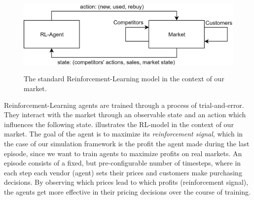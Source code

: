 \begin{figure}[t]
	\centering
	\includegraphics[width = \textwidth]{images/RL_overview.png}\\
	\caption{The standard Reinforcement-Learning model in the context of our market.}\label{fig:IntroRLDiagram}
\end{figure}

Reinforcement-Learning agents are trained through a process of trial-and-error. They interact with the market through an observable state and an action which influences the following state.  illustrates the RL-model in the context of our market. The goal of the agent is to maximize its \emph{reinforcement signal}, which in the case of our simulation framework is the profit the agent made during the last episode, since we want to train agents to maximize profits on real markets. An episode consists of a fixed, but pre-configurable number of timesteps, where in each step each vendor (agent) sets their prices and customers make purchasing decisions. By observing which prices lead to which profits (reinforcement signal), the agents get more effective in their pricing decisions over the course of training.